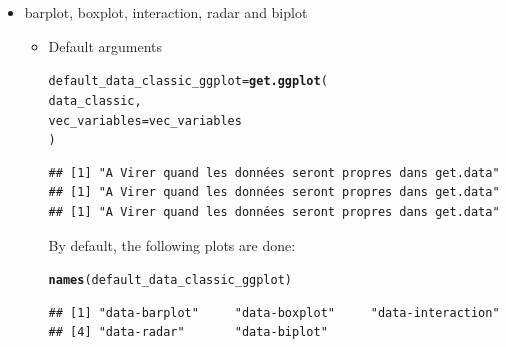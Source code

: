 \documentclass{article}\usepackage[]{graphicx}\usepackage[]{color}
\makeatletter
\newcommand{\hlstd}[1]{\textcolor[rgb]{0.345,0.345,0.345}{#1}}%
\newcommand{\hlkwb}[1]{\textcolor[rgb]{0.69,0.353,0.396}{#1}}%
\newcommand{\hlkwc}[1]{\textcolor[rgb]{0.333,0.667,0.333}{#1}}%
\newcommand{\hlkwd}[1]{\textcolor[rgb]{0.737,0.353,0.396}{\textbf{#1}}}%
\newenvironment{kframe}{%
 \def\at@end@of@kframe{}%
 \ifinner\ifhmode%
  \def\at@end@of@kframe{\end{minipage}}%
  \begin{minipage}{\columnwidth}%
 \fi\fi%
 \def\FrameCommand##1{\hskip\@totalleftmargin \hskip-\fboxsep
 \colorbox{shadecolor}{##1}\hskip-\fboxsep
     \hskip-\linewidth \hskip-\@totalleftmargin \hskip\columnwidth}%
 \MakeFramed {\advance\hsize-\width
   \@totalleftmargin\z@ \linewidth\hsize
   \@setminipage}}%
 {\par\unskip\endMakeFramed%
 \at@end@of@kframe}
\newenvironment{knitrout}{}{} %
\makeatother
\begin{document}
\begin{itemize}

\item barplot, boxplot, interaction, radar and biplot

\begin{itemize}

\item Default arguments
\begin{knitrout}
\color{fgcolor}\begin{kframe}
\begin{alltt}
\hlstd{default_data_classic_ggplot} \hlkwb{=} \hlkwd{get.ggplot}\hlstd{(}
        \hlstd{data_classic,}
        \hlkwc{vec_variables} \hlstd{= vec_variables}
        \hlstd{)}
\end{alltt}


{\ttfamily\noindent\itshape\color{messagecolor}{\#\# As ggplot.type is NULL, ggplot.Type is set to data-barplot, data-boxplot, data-interaction, data-radar, data-biplot\\\#\# As x.axis and in.col are NULL, all the combinaisons of x.axis and in.col are done for data-barplot, data-boxplot and data-interaction.\\\#\# As in.col is NULL, each in.col are done for data-radar and data-biplot.}}\begin{verbatim}
## [1] "A Virer quand les données seront propres dans get.data"
## [1] "A Virer quand les données seront propres dans get.data"
## [1] "A Virer quand les données seront propres dans get.data"
\end{verbatim}


{\ttfamily\noindent\itshape{}}\end{kframe}
\end{knitrout}

By default, the following plots are done:
\begin{knitrout}
\color{fgcolor}\begin{kframe}
\begin{alltt}
\hlkwd{names}\hlstd{(default_data_classic_ggplot)}
\end{alltt}
\begin{verbatim}
## [1] "data-barplot"     "data-boxplot"     "data-interaction"
## [4] "data-radar"       "data-biplot"
\end{verbatim}
\end{kframe}
\end{knitrout}


\end{itemize}
\end{itemize}
\end{document}
